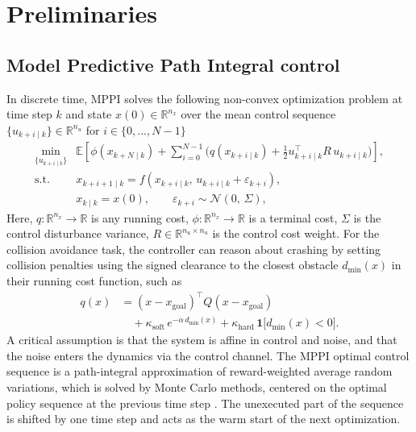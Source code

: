 \documentclass[letterpaper, 10 pt, conference]{ieeeconf}
\begin{document}
\section{Preliminaries}
\subsection{Model Predictive Path Integral control}
In discrete time, MPPI solves the following non-convex optimization problem at time step $k$ and state ${x(0) \in \mathbb{R}^{n_x}}$ over the mean control sequence $\{ u_{k+i\mid k}\}\in\mathbb{R}^{n_u}$ for $i \in  \{0, ..., N-1\}$
\begin{subequations}
\label{eq:sc-mppi}
\begin{align}
\min_{\{u_{k+i\mid k}\}}
& \mathbb{E}\!\left[
\phi\!\left(x_{k+N\mid k}\right)
\!+\!\!\sum_{i=0}^{N-1}\Big(q(x_{k+i\mid k})\!+\!\tfrac{1}{2}u_{k+i\mid k}^\top R\,u_{k+i\mid k}\Big)
\right], \tag{1a}\\
\text{s.t.}\quad
& x_{k+i+1\mid k}=f\!\left(x_{k+i\mid k},\,u_{k+i\mid k}+\varepsilon_{k+i}\right), \tag{1b}\\
& x_{k\mid k}=x(0),\qquad \varepsilon_{k+i}\sim\mathcal{N}(0,\,\Sigma), \tag{1c}
\end{align}
\end{subequations}
Here, ${q: \mathbb{R}^{n_x} \rightarrow \mathbb{R}}$ is any running cost, ${\phi : \mathbb{R}^{n_x} \rightarrow \mathbb{R}}$ is a terminal cost, $\Sigma$ is the control disturbance variance, $R \in \mathbb{R}^{n_u \times n_u}$ is the control cost weight.
For the collision avoidance task, the controller can reason about crashing by setting collision penalties using the signed clearance to the closest obstacle $d_{\min}(x)$ in their running cost function, such as
\begin{equation}
\begin{aligned}
q(x)
&=(x-x_{\mathrm{goal}})^\top Q (x-x_{\mathrm{goal}})\\
&\quad+\kappa_{\text{soft}}\,e^{-\alpha\,d_{\min}(x)}
+\kappa_{\text{hard}}\,\mathbf{1}\!\bigl[d_{\min}(x)<0\bigr].
\label{eq:mppisoftconstraint}
\end{aligned}
\end{equation}
A critical assumption is that the system is affine in control and noise, and that the noise enters the dynamics via the control channel. The MPPI optimal control sequence is a path-integral approximation of reward-weighted average random variations, which is solved by Monte Carlo methods, centered on the optimal policy sequence at the previous time step \cite{williams2017model}. The unexecuted part of the sequence is shifted by one time step and acts as the warm start of the next optimization. 
\end{document}
